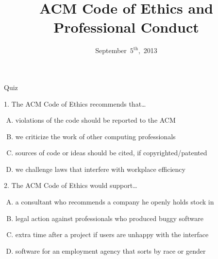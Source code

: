 \documentclass{beamer}
\title[ACM Code]{ACM Code of Ethics and Professional Conduct}
\date{September~$5^{\text{th}}$,~2013}
\begin{document}
\begin{frame}
\titlepage
\end{frame}

\begin{frame}{Quiz}
\begin{block}{1. The ACM Code of Ethics recommends that\ldots}
\begin{enumerate}[(A)]
\item<1> violations of the code should be reported to the ACM
\item<1-3> we criticize the work of other computing professionals
\item<1> sources of code or ideas should be cited, if copyrighted/patented
\item<1> we challenge laws that interfere with workplace efficiency
\end{enumerate}
\end{block}
\begin{block}{2. The ACM Code of Ethics would support\ldots}
\begin{enumerate}[(A)]
\item<1-3> a consultant who recommends a company he openly holds stock in
\item<1-2> legal action against professionals who produced buggy software
\item<1-2> extra time after a project if users are unhappy with the interface
\item<1-2> software for an employment agency that sorts by race or gender
\end{enumerate}
\end{block}
\end{frame}
\end{document}
